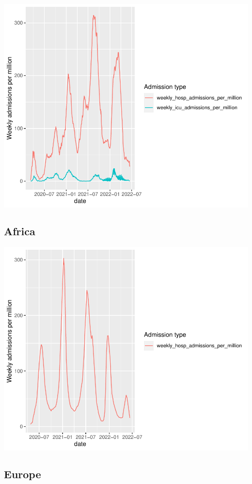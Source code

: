 \documentclass[11pt,preprint, authoryear]{elsarticle}
\numberwithin{equation}{section}
\numberwithin{figure}{section}
\numberwithin{table}{section}
\begin{document}
\includegraphics{Question1_files/figure-latex/unnamed-chunk-2-1.pdf}

\hypertarget{africa}{%
\subsection{Africa}\label{africa}}

\includegraphics{Question1_files/figure-latex/unnamed-chunk-3-1.pdf}

\hypertarget{europe}{%
\subsection{Europe}\label{europe}}
\end{document}
